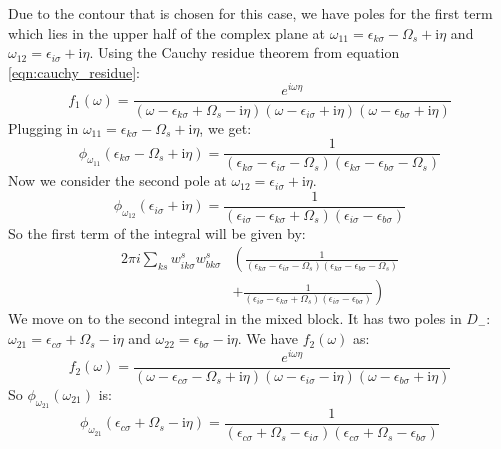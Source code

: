 \documentclass[12pt]{article}
\begin{document}
Due to the contour that is chosen for this case, we have poles for the first term which lies in the upper half of the complex plane at $\omega_{11} = \epsilon _{k \sigma } - \Omega_s + \mathrm{i} \eta$ and $\omega_{12} = \epsilon _{i \sigma } + \mathrm{i} \eta$.
Using the Cauchy residue theorem from equation \ref{eqn:cauchy_residue}:
\begin{equation}
f_1(\omega) = \frac{e^{i\omega \eta }}{(\omega-\epsilon_{k \sigma}+\Omega_s-\mathrm{i} \eta)(\omega-\epsilon_{i \sigma}+\mathrm{i} \eta)(\omega-\epsilon_{b \sigma}+\mathrm{i} \eta)}
\end{equation}
Plugging in $\omega_{11} = \epsilon _{k \sigma } - \Omega_s + \mathrm{i} \eta$, we get:
\begin{equation}
\boxed{\phi_{\omega_{11}}(\epsilon_{k \sigma } - \Omega_s + \mathrm{i} \eta) = \frac{1}{(\epsilon_{k \sigma} -\epsilon_{i \sigma}-\Omega_s)(\epsilon_{k \sigma} -\epsilon_{b \sigma}-\Omega_s)}}
\end{equation}
Now we consider the second pole at $\omega_{12} = \epsilon _{i \sigma } + \mathrm{i} \eta$.
\begin{equation}
\boxed{\phi_{\omega_{12}}(\epsilon_{i \sigma} + \mathrm{i} \eta) = \frac{1}{(\epsilon_{i \sigma} -\epsilon_{k \sigma}+\Omega_s)(\epsilon_{i \sigma} -\epsilon_{b \sigma})}}
\end{equation}
So the first term of the integral will be given by:
\begin{equation}
\begin{aligned}
2\pi i \sum_{ks} w_{i k \sigma}^s w_{b k \sigma}^s & \left( \frac{1}{(\epsilon_{k \sigma} -\epsilon_{i \sigma}-\Omega_s)(\epsilon_{k \sigma} -\epsilon_{b \sigma}-\Omega_s)} \right. \\
& \left. + \frac{1}{(\epsilon_{i \sigma} -\epsilon_{k \sigma}+\Omega_s)(\epsilon_{i \sigma} -\epsilon_{b \sigma})} \right)
\end{aligned}
\end{equation}
We move on to the second integral in the mixed block. It has two poles in $D_-$: $\omega_{21} = \epsilon _{c\sigma } + \Omega_s - \mathrm{i} \eta$ and $\omega_{22} = \epsilon _{b \sigma } - \mathrm{i} \eta$. We have $f_2(\omega)$ as:
\begin{equation}
f_2(\omega) = \frac{e^{i\omega \eta }}{(\omega-\epsilon_{c \sigma}-\Omega_s+\mathrm{i} \eta)(\omega-\epsilon_{i \sigma}-\mathrm{i} \eta)(\omega-\epsilon_{b \sigma}+\mathrm{i} \eta)}
\end{equation}
So $\phi_{\omega_{21}}(\omega _{21})$ is:
\begin{equation}
\boxed{\phi_{\omega_{21}}(\epsilon_{c \sigma} + \Omega_s - \mathrm{i} \eta) = \frac{1}{(\epsilon_{c \sigma} + \Omega_s -\epsilon_{i \sigma})(\epsilon_{c \sigma} + \Omega_s -\epsilon_{b \sigma})}}
\end{equation}
\end{document}
